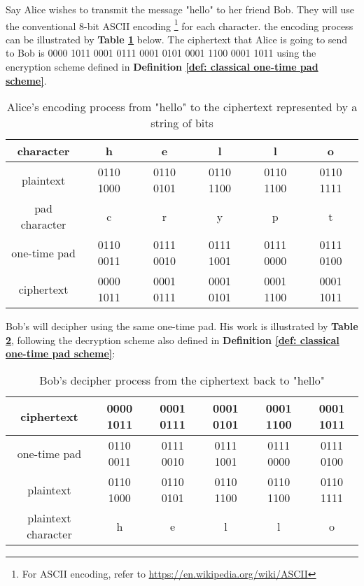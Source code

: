 \begin{example}
\label{example one-time pad}
Say Alice wishes to transmit the message "hello" to her friend Bob.  They will use the conventional 8-bit ASCII encoding \footnote{For ASCII encoding, refer to \url{https://en.wikipedia.org/wiki/ASCII}} for each character.  the encoding process can be illustrated by \textbf{Table  \ref{table: one-time pad encoding}} below. The ciphertext that Alice is going to send to Bob is 0000 1011 0001 0111 0001 0101 0001 1100 0001 1011 using the encryption scheme defined in \textbf{Definition \ref{def: classical one-time pad scheme}}.

\begin{table}[h]
\centering 
\begin{tabular}{|c|c|c|c|c|c|}
\hline
character & h & e & l & l & o \\ \hline
plaintext & 0110 1000 & 0110 0101 & 0110 1100 & 0110 1100 & 0110 1111 \\ \hline
pad character & c & r & y & p & t \\ \hline
one-time pad & 0110 0011 & 0111 0010 & 0111 1001 & 0111 0000 & 0111 0100 \\ \hline
ciphertext & 0000 1011 & 0001 0111 & 0001 0101 & 0001 1100 & 0001 1011 \\ \hline
\end{tabular}
\caption{Alice's encoding process from "hello" to the ciphertext represented by a string of bits}
\label{table: one-time pad encoding}
\end{table}

Bob's will decipher using the same one-time pad.   His work is illustrated by \textbf{Table \ref{table: one-time pad decoding}}, following the decryption scheme also defined in \textbf{Definition \ref{def: classical one-time pad scheme}}:
\begin{table}[h] 
\centering
\begin{tabular}{|c|c|c|c|c|c|}
\hline
ciphertext & 0000 1011 & 0001 0111 & 0001 0101 & 0001 1100 & 0001 1011 \\ \hline
one-time pad & 0110 0011 & 0111 0010 & 0111 1001 & 0111 0000 & 0111 0100 \\ \hline
plaintext & 0110 1000 & 0110 0101 & 0110 1100 & 0110 1100 & 0110 1111 \\ \hline
plaintext character & h & e & l & l & o \\ \hline
\end{tabular}
\caption{Bob's decipher process from the ciphertext back to "hello"}
\label{table: one-time pad decoding}
\end{table}
\end{example}




